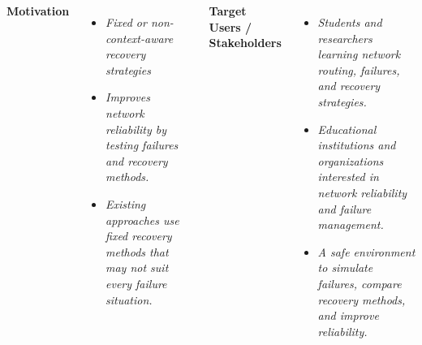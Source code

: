 \documentclass[aspectratio=169,11pt]{beamer}
\newcommand{\placeholder}[1]{\textit{\color{GEUGrey}#1}}
\begin{document}
\begin{columns}[T,onlytextwidth]

\footnotesize
\textbf{\color{GEUBlue}Motivation}

\begin{itemize}
\setlength{\itemsep}{0pt}
\setlength{\parskip}{0pt}
\setlength{\parsep}{0pt}

\item \placeholder{Fixed or non-context-aware recovery strategies}
\item \placeholder{Improves network reliability by testing failures and recovery methods.}
\item \placeholder{Existing approaches use fixed recovery methods that may not suit every failure situation.}
\end{itemize}


\footnotesize
\textbf{\color{GEUBlue}Target Users / Stakeholders}

\begin{itemize}
\setlength{\itemsep}{0pt}
\setlength{\parskip}{0pt}
\setlength{\parsep}{0pt}

\item \placeholder{Students and researchers learning network routing, failures, and recovery strategies.}
\item \placeholder{Educational institutions and organizations interested in network reliability and failure management.}
\item \placeholder{A safe environment to simulate failures, compare recovery methods, and improve reliability.}
\end{itemize}

\end{columns}
\end{document}
